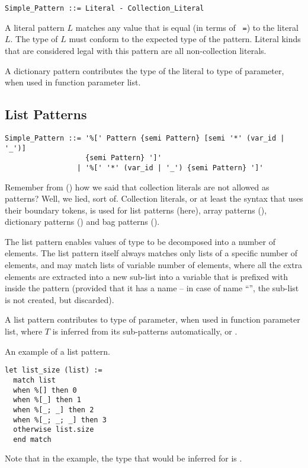 \syntax\begin{lstlisting}
Simple_Pattern ::= Literal - Collection_Literal
\end{lstlisting}

A literal pattern $L$ matches any value that is equal (in terms of ~\lstinline!=!) to the literal $L$. The type of $L$ must conform to the expected type of the pattern. Literal kinds that are considered legal with this pattern are all non-collection literals. 

A dictionary pattern contributes the type of the literal to type of parameter, when used in function parameter list. 





\subsection{List Patterns}
\label{sec:list-patterns}

\syntax\begin{lstlisting}
Simple_Pattern ::= '%[' Pattern {semi Pattern} [semi '*' (var_id | '_')] 
                   {semi Pattern} ']'
                 | '%[' '*' (var_id | '_') {semi Pattern} ']'
\end{lstlisting}

Remember from () how we said that collection literals are not allowed as patterns? Well, we lied, sort of. Collection literals, or at least the syntax that uses their boundary tokens, is used for list patterns (here), array patterns (), dictionary patterns () and bag patterns (). 

The list pattern enables values of  type to be decomposed into a number of elements. The list pattern itself always matches only lists of a specific number of elements, and may match lists of variable number of elements, where all the extra elements are extracted into a new sub-list into a variable that is prefixed with \code{*} inside the pattern (provided that it has a name -- in case of name ``\code{_}'', the sub-list is not created, but discarded). 

A list pattern contributes  to type of parameter, when used in function parameter list, where $T$ is inferred from its sub-patterns automatically, or . 

\example An example of a list pattern.
\begin{lstlisting}
let list_size (list) := 
  match list 
  when %[] then 0
  when %[_] then 1
  when %[_; _] then 2
  when %[_; _; _] then 3
  otherwise list.size
  end match
\end{lstlisting}
Note that in the example, the type that would be inferred for  is . 




